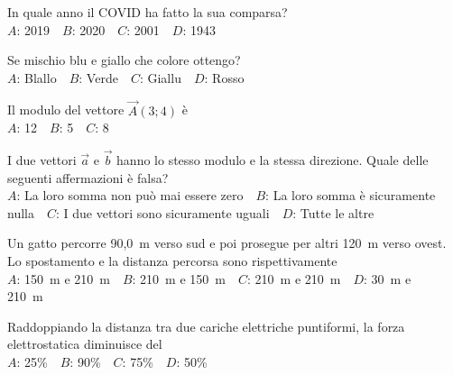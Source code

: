 \mcquestionfooter



\def\mcquestionnumber{8}


\mcquestionheader In quale anno il COVID ha fatto la sua comparsa?\\
{$A$}: 2019\ \ {$B$}: 2020\ \ {$C$}: 2001\ \ {$D$}: 1943\ \ 

\mcquestionfooter



\def\mcquestionnumber{9}


\mcquestionheader Se mischio blu e giallo che colore ottengo?\\
{$A$}: Blallo\ \ {$B$}: Verde\ \ {$C$}: Giallu\ \ {$D$}: Rosso\ \ 

\mcquestionfooter



\def\mcquestionnumber{10}


\mcquestionheader Il modulo del vettore $\vec{A}(3;4)$ è\\
{$A$}: 12\ \ {$B$}: 5\ \ {$C$}: 8\ \ 

\mcquestionfooter



\def\mcquestionnumber{11}


\mcquestionheader I due vettori $\vec{a}$ e $\vec{b}$ hanno lo stesso modulo e la stessa direzione. Quale delle seguenti affermazioni è falsa?\\
{$A$}: La loro somma non può mai essere zero\ \ {$B$}: La loro somma è sicuramente nulla\ \ {$C$}: I due vettori sono sicuramente uguali\ \ {$D$}: Tutte le altre\ \ 

\mcquestionfooter



\def\mcquestionnumber{12}


\mcquestionheader Un gatto percorre 90,0~m verso sud e poi prosegue per altri 120~m verso ovest. Lo spostamento e la distanza percorsa sono rispettivamente\\
{$A$}: 150~m e 210~m\ \ {$B$}: 210~m e 150~m\ \ {$C$}: 210~m e 210~m\ \ {$D$}: 30~m e 210~m\ \ 

\mcquestionfooter



\mcpaperfooter

\def\mcserialnumber{24}
\mcpaperheader


\def\mcquestionnumber{1}


\mcquestionheader Raddoppiando la distanza tra due cariche elettriche puntiformi, la forza elettrostatica diminuisce del\\
{$A$}: 25\%\ \ {$B$}: 90\%\ \ {$C$}: 75\%\ \ {$D$}: 50\%\ \ 

